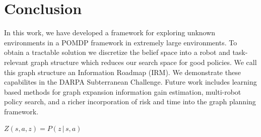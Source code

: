 \documentclass{article}
\begin{document}
\section{Conclusion}

In this work, we have developed a framework for exploring unknown environments in a POMDP framework in extremely large environments.  
To obtain a tractable solution we discretize the belief space into a robot and task-relevant graph structure which reduces our search space for good policies.  We call this graph structure an Information Roadmap (IRM).  We demonstrate these capabilites in the DARPA Subterranean Challenge.  Future work includes learning based methods for graph expansion information gain estimation, multi-robot policy search, and a richer incorporation of risk and time into the graph planning framework.

$Z(s, a, z) = P(z\,|\,s, a)$



\end{document}
